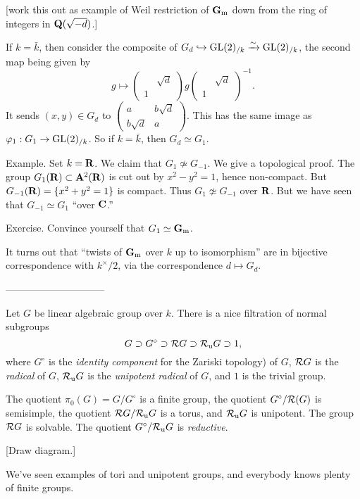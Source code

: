 [work this out as example of Weil restriction of $\operatorname{\mathbf{G}_m}$ down from the ring of 
integers in $\mathbf{Q}(\sqrt{-d})$.]

If $k=\bar k$, then consider the composite of $G_d\hookrightarrow \operatorname{GL}(2)_{/k}\xrightarrow\sim \operatorname{GL}(2)_{/k}$, 
the second map being given by 
\[
  g\mapsto \begin{pmatrix} & \sqrt d \\ 1 \end{pmatrix} g \begin{pmatrix} & \sqrt d \\ 1 \end{pmatrix}^{-1} .
\]
It sends $(x,y)\in G_d$ to $\begin{pmatrix} a & b\sqrt d \\ b\sqrt d & a \end{pmatrix}$. 
This has the same image as $\varphi_1:G_1\to \operatorname{GL}(2)_{/k}$. So if $k=\bar k$, then 
$G_d\simeq G_1$. 

Example. Set $k=\mathbf{R}$. We claim that $G_1\not\simeq G_{-1}$. We give a topological 
proof. The group $G_1(\mathbf{R})\subset \mathbf{A}^2(\mathbf{R})$ is cut out by $x^2-y^2=1$, hence 
non-compact. But $G_{-1}(\mathbf{R})=\{x^2+y^2=1\}$ is compact. Thus 
$G_1\not\simeq G_{-1}$ over $\mathbf{R}$. 
But we have seen that $G_{-1}\simeq G_1$ ``over $\mathbf{C}$.'' 

Exercise. Convince yourself that $G_1\simeq \operatorname{\mathbf{G}_m}$. 

It turns out that ``twists of $\operatorname{\mathbf{G}_m}$ over $k$ up to isomorphism'' are in 
bijective correspondence with $k^\times/2$, via the correspondence 
$d\mapsto G_d$. 





------------------------------

Let $G$ be linear algebraic group over $k$. There is a nice filtration of normal 
subgroups 
\[
  G\supset G^\circ\supset \mathcal{R} G\supset \mathcal{R}_\mathrm{u} G \supset 1,
\]
where $G^\circ$ is the \emph{identity component}  for the Zariski topology) of $G$, 
$\mathcal{R} G$ is the \emph{radical} of $G$, $\mathcal{R}_\mathrm{u} G$ is the \emph{unipotent 
radical} of $G$, and $1$ is the trivial group. 

The quotient $\pi_0(G)=G/G^\circ$ is a finite group, the quotient 
$G^\circ/\mathcal{R}(G)$ is semisimple, the quotient $\mathcal{R} G/\mathcal{R}_\mathrm{u} G$ is a torus, 
and $\mathcal{R}_\mathrm{u} G$ is unipotent. The group $\mathcal{R} G$ is solvable. The quotient 
$G^\circ/\mathcal{R}_\mathrm{u} G$ is \emph{reductive}. 

[Draw diagram.]

We've seen examples of tori and unipotent groups, and everybody knows plenty of 
finite groups. 

